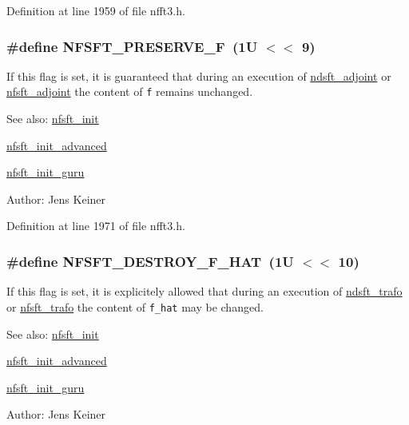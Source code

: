 Definition at line 1959 of file nfft3.h.\hypertarget{group__nfsft_g45962e763c2c551c1ea764a68b686b5c}{
\subsubsection{\setlength{\rightskip}{0pt plus 5cm}\#define NFSFT\_\-PRESERVE\_\-F~(1U $<$$<$ 9)}}
\label{group__nfsft_g45962e763c2c551c1ea764a68b686b5c}


If this flag is set, it is guaranteed that during an execution of \hyperlink{group__nfsft_g88c7be3ead1c726a1d5b8b903952c527}{ndsft\_\-adjoint} or \hyperlink{group__nfsft_g813bb48d404c7286310733c99a81a169}{nfsft\_\-adjoint} the content of {\tt f} remains unchanged. 

\begin{Desc}
\item[See also:]\hyperlink{group__nfsft_g65cda3f4a3edc5eb39c697cf34b1f0b9}{nfsft\_\-init} 

\hyperlink{group__nfsft_ge7dca3e41afdb39e8c518af414878c18}{nfsft\_\-init\_\-advanced} 

\hyperlink{group__nfsft_g60466ed37643b6b7b7c1638056604d2b}{nfsft\_\-init\_\-guru} \end{Desc}
\begin{Desc}
\item[Author:]Jens Keiner \end{Desc}


Definition at line 1971 of file nfft3.h.\hypertarget{group__nfsft_ga808899fc4db422c7b23470e6baad904}{
\subsubsection{\setlength{\rightskip}{0pt plus 5cm}\#define NFSFT\_\-DESTROY\_\-F\_\-HAT~(1U $<$$<$ 10)}}
\label{group__nfsft_ga808899fc4db422c7b23470e6baad904}


If this flag is set, it is explicitely allowed that during an execution of \hyperlink{group__nfsft_gc1bcdf551a0bf1b4a5890b87e583caf8}{ndsft\_\-trafo} or \hyperlink{group__nfsft_g5796fc68c432d46dfcab7abd8c56ee22}{nfsft\_\-trafo} the content of {\tt f\_\-hat} may be changed. 

\begin{Desc}
\item[See also:]\hyperlink{group__nfsft_g65cda3f4a3edc5eb39c697cf34b1f0b9}{nfsft\_\-init} 

\hyperlink{group__nfsft_ge7dca3e41afdb39e8c518af414878c18}{nfsft\_\-init\_\-advanced} 

\hyperlink{group__nfsft_g60466ed37643b6b7b7c1638056604d2b}{nfsft\_\-init\_\-guru} \end{Desc}
\begin{Desc}
\item[Author:]Jens Keiner \end{Desc}


